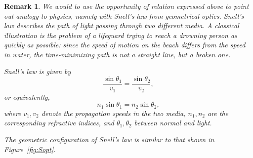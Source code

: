 \documentclass[openany]{book}
\newtheorem{remark}{Remark}
\begin{document}
 	
	
	\begin{remark}\label{Snell}
	We would to use the opportunity of relation expressed above to point out analogy to physics, namely with Snell's law from geometrical optics. Snell's law describes the path of light passing through two different media. A classical illustration is the problem of a lifeguard trying to reach a drowning person as quickly as possible: since the speed of motion on the beach differs from the speed in water, the time-minimizing path is not a straight line, but a broken one.
	
	Snell's law is given by
	\[
	\frac{\sin \theta_1}{v_1}=\frac{\sin \theta_2}{v_2},
	\]
	or equivalently,
	\[
	n_1 \sin \theta_1 = n_2 \sin \theta_2,
	\]
	where \(v_1, v_2\) denote the propagation speeds in the two media, \(n_1, n_2\) are the corresponding refractive indices, and \(\theta_1, \theta_2\) between normal and light.
	
	The geometric configuration of Snell's law is similar to that shown in Figure~\ref{fig:Sopt}. 
	
	\begin{figure}
		\centering
\end{figure}
\end{remark}
\end{document}

